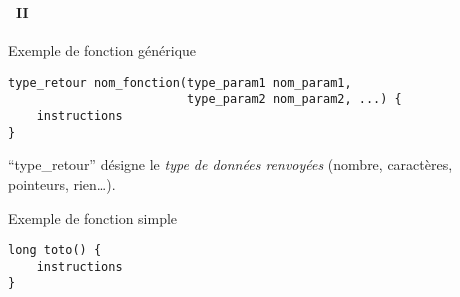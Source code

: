 \begin{frame}[containsverbatim]
  \frametitle{\secname}
  \framesubtitle{\subsecname~II}
  
  \begin{block}{Exemple de fonction générique}
    {\small\begin{verbatim}
type_retour nom_fonction(type_param1 nom_param1, 
                         type_param2 nom_param2, ...) {
    instructions
}
    \end{verbatim}}
  \end{block}
  ``type\_retour'' désigne le \emph{type de données renvoyées} (nombre, caractères, pointeurs, rien\ldots).
  \begin{exampleblock}{Exemple de fonction simple}
    \begin{verbatim}
long toto() {
    instructions
}       
    \end{verbatim}
  \end{exampleblock}
\end{frame}

